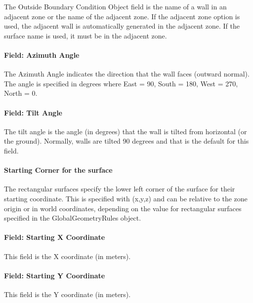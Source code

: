 The Outside Boundary Condition Object field is the name of a wall in an adjacent zone or the name of the adjacent zone. If the adjacent zone option is used, the adjacent wall is automatically generated in the adjacent zone. If the surface name is used, it must be in the adjacent zone.

\paragraph{Field: Azimuth Angle}\label{field-azimuth-angle-3}

The Azimuth Angle indicates the direction that the wall faces (outward normal). The angle is specified in degrees where East = 90, South = 180, West = 270, North = 0.

\paragraph{Field: Tilt Angle}\label{field-tilt-angle-3}

The tilt angle is the angle (in degrees) that the wall is tilted from horizontal (or the ground). Normally, walls are tilted 90 degrees and that is the default for this field.

\paragraph{Starting Corner for the surface}\label{starting-corner-for-the-surface-3}

The rectangular surfaces specify the lower left corner of the surface for their starting coordinate. This is specified with (x,y,z) and can be relative to the zone origin or in world coordinates, depending on the value for rectangular surfaces specified in the GlobalGeometryRules object.

\paragraph{Field: Starting X Coordinate}\label{field-starting-x-coordinate-3}

This field is the X coordinate (in meters).

\paragraph{Field: Starting Y Coordinate}\label{field-starting-y-coordinate-3}

This field is the Y coordinate (in meters).

